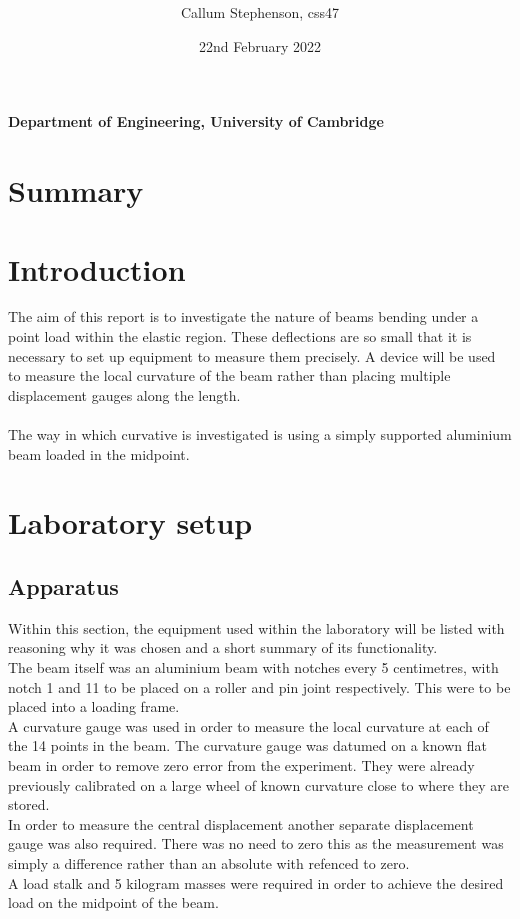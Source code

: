 \documentclass[12pt]{article}
\title{\textbf{}}
\author{Callum Stephenson, css47}
\date{22nd February 2022}
\begin{document}
    \begin{titlepage}
        \maketitle
        \thispagestyle{empty}
        \vspace{13cm}
        \textbf{Department of Engineering, University of Cambridge}
    \end{titlepage}
    \newpage
    \section{Summary}
    \section{Introduction}
        The aim of this report is to investigate the nature of beams bending under a point load within the elastic region. These deflections are so 
        small that it is necessary to set up equipment to measure them precisely. 
        A device will be used to measure the local curvature of the beam rather than placing multiple displacement gauges along the length. \\ \\
        The way in which curvative is investigated is using a simply supported aluminium beam loaded in the midpoint. 
    \section{Laboratory setup}
        \subsection{Apparatus}
            Within this section, the equipment used within the laboratory will be listed with reasoning why it was chosen and a short summary of its functionality. \\
            The beam itself was an aluminium beam with notches every 5 centimetres, with notch 1 and 11 to be placed on a roller and pin joint respectively. This were to be
            placed into a loading frame. \\
            A curvature gauge was used in order to measure the local curvature at each of the 14 points in the beam. The curvature gauge was datumed on a known flat beam
            in order to remove zero error from the experiment. They were already previously calibrated on a large wheel of known curvature close to where they are stored.\\
            In order to measure the central displacement another separate displacement gauge was also required. There was no need to zero this as the measurement
            was simply a difference rather than an absolute with refenced to zero. \\
            A load stalk and 5 kilogram masses were required in order to achieve the desired load on the midpoint of the beam.
\end{document}
